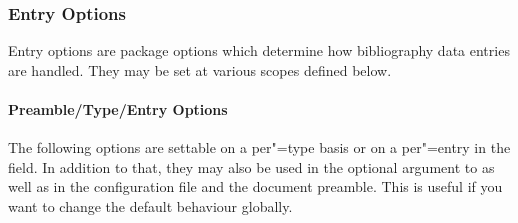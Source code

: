 \documentclass{ltxdockit}[2011/03/25]
\begin{document}
\subsubsection{Entry Options}
\label{use:opt:bib}

Entry options are package options which determine how bibliography data entries are handled. They may be set at various scopes defined below.

\paragraph{Preamble/Type/Entry Options}
\label{use:opt:bib:hyb}

The following options are settable on a per"=type basis or on a per"=entry in the  field. In addition to that, they may also be used in the optional argument to  as well as in the configuration file and the document preamble. This is useful if you want to change the default behaviour globally.
\end{document}
